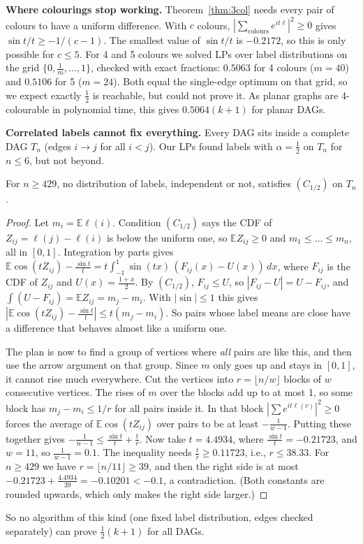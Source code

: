 \documentclass[sigconf,nonacm]{acmart}
\newcommand{\E}{\mathbb{E}}
\begin{document}
 \textbf{Where colourings stop working.} Theorem~\ref{thm:3col} needs every pair of colours to have a uniform difference. With $c$ colours, $|\sum_{\text{colours}}e^{it\ell}|^2\ge0$ gives $\sin t/t\ge-1/(c-1)$. The smallest value of $\sin t/t$ is $-0.2172$, so this is only possible for $c\le5$. For 4 and 5 colours we solved LPs over label distributions on the grid $\{0,\frac1m,\dots,1\}$, checked with exact fractions: $0.5063$ for 4 colours ($m=40$) and $0.5106$ for 5 ($m=24$). Both equal the single-edge optimum on that grid, so we expect exactly $\frac12$ is reachable, but could not prove it. As planar graphs are 4-colourable in polynomial time, this gives $0.5064(k+1)$ for planar DAGs.

\textbf{Correlated labels cannot fix everything.} Every DAG sits inside a complete DAG $T_n$ (edges $i\to j$ for all $i<j$). Our LPs found labels with $\alpha=\frac12$ on $T_n$ for $n\le6$, but not beyond.

\begin{theorem}
For $n\ge429$, no distribution of labels, independent or not, satisfies $(C_{1/2})$ on $T_n$.
\end{theorem}
\begin{proof}
 Let $m_i=\E\ell(i)$. Condition $(C_{1/2})$ says the CDF of $Z_{ij}=\ell(j)-\ell(i)$ is below the uniform one, so $\E Z_{ij}\ge0$ and $m_1\le\dots\le m_n$, all in $[0,1]$. Integration by parts gives $\E\cos(tZ_{ij})-\frac{\sin t}t=t\int_{-1}^1\sin(tx)\,(F_{ij}(x)-U(x))\,dx$, where $F_{ij}$ is the CDF of $Z_{ij}$ and $U(x)=\frac{1+x}2$. By $(C_{1/2})$, $F_{ij}\le U$, so $|F_{ij}-U|=U-F_{ij}$, and $\int(U-F_{ij})=\E Z_{ij}=m_j-m_i$. With $|\sin|\le1$ this gives $|\E\cos(tZ_{ij})-\frac{\sin t}t|\le t(m_j-m_i)$. So pairs whose label means are close have a difference that behaves almost like a uniform one.

 The plan is now to find a group of vertices where \emph{all} pairs are like this, and then use the arrow argument on that group. Since $m$ only goes up and stays in $[0,1]$, it cannot rise much everywhere. Cut the vertices into $r=\lfloor n/w\rfloor$ blocks of $w$ consecutive vertices. The rises of $m$ over the blocks add up to at most 1, so some block has $m_j-m_i\le1/r$ for all pairs inside it. In that block $|\sum e^{it\ell(v)}|^2\ge0$ forces the average of $\E\cos(tZ_{ij})$ over pairs to be at least $-\frac1{w-1}$. Putting these together gives $-\frac1{w-1}\le\frac{\sin t}t+\frac tr$. Now take $t=4.4934$, where $\frac{\sin t}t=-0.21723$, and $w=11$, so $\frac1{w-1}=0.1$. The inequality needs $\frac tr\ge0.11723$, i.e., $r\le38.33$. For $n\ge429$ we have $r=\lfloor n/11\rfloor\ge39$, and then the right side is at most $-0.21723+\frac{4.4934}{39}=-0.10201<-0.1$, a contradiction. (Both constants are rounded upwards, which only makes the right side larger.)
\end{proof}
So no algorithm of this kind (one fixed label distribution, edges checked separately) can prove $\frac12(k+1)$ for all DAGs.
\end{document}
